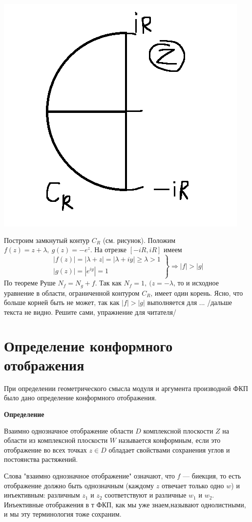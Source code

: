 \documentclass[a4paper, 12pt]{report}
\begin{document}
\includegraphics[width=5 cm]{graphic 2.png}

Построим замкнутый контур $C_R$ (см. рисунок). Положим $f(z) = z + \lambda,\ g(z) = -e^z$. На отрезке $[-iR, iR]$ имеем
$$\left. \begin{matrix}
|f(z)| = |\lambda + z| = |\lambda + iy| \geqslant \lambda > 1 \\ |g(z)| = |e^{iy}| = 1
\end{matrix} \right\} \Rightarrow |f| > |g|$$
По теореме Руше $N_f = N_g+f$. Так как $N_f = 1,\ (z = -\lambda$, то и исходное уравнение в области, ограниченной контуром $C_R$, имеет один корень. Ясно, что больше корней быть не может, так как $|f| > |g|$ выполняется для ... /дальше текста не видно. Решите сами, упражнение для читателя/



\section{Определение конформного отображения}

\hspace{14pt} При определении геометрического смысла модуля и аргумента производной ФКП было дано определение конформного отображения.
\par\bigskip

\textbf{Определение}

Взаимно однозначное отображение области $D$ комплексной плоскости $Z$ на области из комплексной плоскости $W$ называется конформным, если это отображение во всех точках $z\in D$ обладает свойствами сохранения углов и постоянства растяжений.
\par\bigskip

Слова "взаимно однозначное отображение" означают, что $f$ --- биекция, то есть отображение должно быть однозначным (каждому $z$ отвечает только одно $w$) и инъективным: различным $z_1$ и $z_2$ соответствуют и различные $w_1$ и $w_2$. Инъективные отображения в т ФКП, как мы уже знаем,называют однолистными, и мы эту терминология тоже сохраним.
\end{document}
